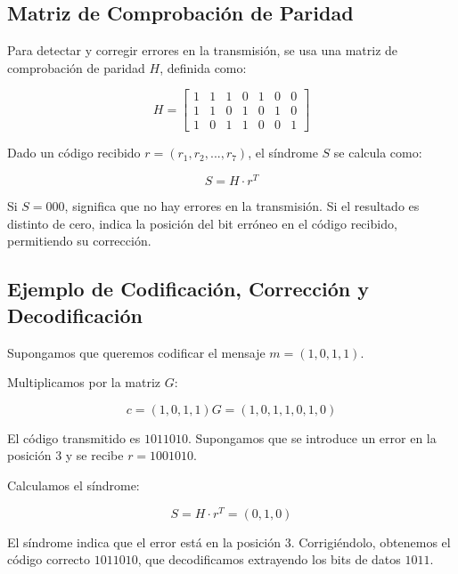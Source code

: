 \subsection{Matriz de Comprobación de Paridad}

Para detectar y corregir errores en la transmisión, se usa una matriz de comprobación de paridad $H$, definida como:

\[
H = \begin{bmatrix} 
1 & 1 & 1 & 0 & 1 & 0 & 0 \\
1 & 1 & 0 & 1 & 0 & 1 & 0 \\
1 & 0 & 1 & 1 & 0 & 0 & 1
\end{bmatrix}
\]

Dado un código recibido $r = (r_1, r_2, ..., r_7)$, el síndrome $S$ se calcula como:

\[
S = H \cdot r^T
\]

Si $S = 000$, significa que no hay errores en la transmisión. Si el resultado es distinto de cero, indica la posición del bit erróneo en el código recibido, permitiendo su corrección.

\subsection{Ejemplo de Codificación, Corrección y Decodificación}

Supongamos que queremos codificar el mensaje $m = (1,0,1,1)$.

Multiplicamos por la matriz $G$:

\[
c = (1,0,1,1) G = (1, 0, 1, 1, 0, 1, 0)
\]

El código transmitido es $1011010$. Supongamos que se introduce un error en la posición 3 y se recibe $r = 1001010$.

Calculamos el síndrome:

\[
S = H \cdot r^T = (0, 1, 0)
\]

El síndrome indica que el error está en la posición 3. Corrigiéndolo, obtenemos el código correcto $1011010$, que decodificamos extrayendo los bits de datos $1011$.